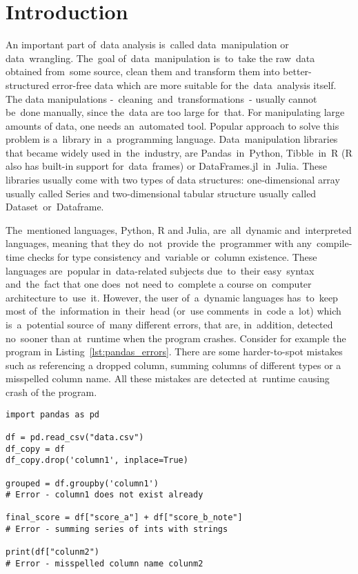 \chapter*{Introduction}

An important part of~data analysis is~called data~manipulation or data~wrangling.
The~goal of~data~manipulation is~to~take the raw~data obtained from~some source, clean them and transform them into
better-structured error-free data which are more suitable for the~data~analysis itself.
The data manipulations -~cleaning~and~transformations~- usually cannot be~done manually, since the~data are too large
for~that.
For manipulating large amounts of data, one needs an~automated tool.
Popular approach to solve this problem is a~library in~a~programming language.
Data~manipulation libraries that became widely used in~the~industry, are Pandas~in~Python\cite{pandas_docs},
Tibble~in~R\cite{tibble} (R also has built-in
support for~data~frames\cite{R-base}) or DataFrames.jl~in~Julia\cite{DataFrames.jl}.
These libraries usually come with two types of data structures: one-dimensional array usually called Series
and two-dimensional tabular structure usually called Dataset~or~Dataframe.

The~mentioned languages, Python, R and Julia, are~all~dynamic and~interpreted languages, meaning that they do~not~provide
the~programmer with any~compile-time checks for type consistency and~variable or~column existence.
These languages are~popular in~data-related subjects due~to~their easy~syntax and~the~fact that
one does~not need to~complete a course on~computer architecture to~use~it.
However, the user of~a~dynamic languages has~to~keep most of~the~information in~their~head (or~use comments~in~code a~lot)
which is~a~potential source of~many different errors, that are, in~addition, detected no~sooner than at~runtime when
the program crashes.
Consider for example the program in Listing~\ref{lst:pandas_errors}.
There are some harder-to-spot mistakes such as referencing a dropped column, summing columns of different types
or a misspelled column name.
All these mistakes are detected at~runtime causing crash of the program.

\begin{lstlisting}[caption=Pandas code with errors, label={lst:pandas_errors}, captionpos=b]
import pandas as pd

df = pd.read_csv("data.csv")
df_copy = df
df_copy.drop('column1', inplace=True)

grouped = df.groupby('column1')
# Error - column1 does not exist already

final_score = df["score_a"] + df["score_b_note"]
# Error - summing series of ints with strings

print(df["colunm2")
# Error - misspelled column name colunm2

\end{lstlisting}

